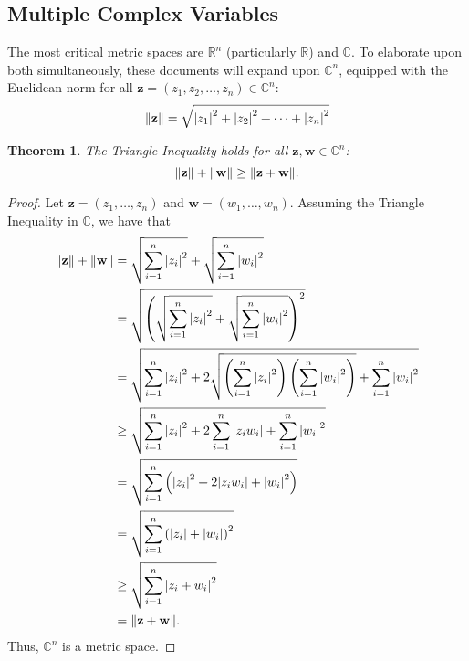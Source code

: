 \documentclass[11pt]{article}
\renewcommand{\vec}[1]{\mathbf{#1}}
\newtheorem{theorem}{Theorem}
\begin{document}

\subsection{Multiple Complex Variables}

The most critical metric spaces are $\mathbb{R}^{n}$ (particularly $\mathbb{R}$) and $\mathbb{C}$. To elaborate upon both simultaneously, these documents will expand upon $\mathbb{C}^{n}$, equipped with the Euclidean norm for all $\vec{z} = (z_{1}, z_{2}, \ldots, z_{n}) \in \mathbb{C}^{n}$:
\[
	\norm{\vec{z}} = \sqrt{\abs{z_{1}}^{2} + \abs{z_{2}}^{2} + \cdots + \abs{z_{n}}^{2}}
\]
\newpage
\begin{theorem}
	The Triangle Inequality holds for all $\vec{z}, \vec{w} \in \mathbb{C}^{n}$:
	\[
		\norm{\vec{z}} + \norm{\vec{w}} \ge \norm{\vec{z} + \vec{w}}.
	\]
\end{theorem}
\begin{adjustwidth}{1cm}{}
	\begin{proof}
		Let $\vec{z} = (z_{1}, \ldots, z_{n})$ and $\vec{w} = (w_{1}, \ldots, w_{n})$. Assuming the Triangle Inequality in $\mathbb{C}$, we have that
		\begin{align*}
			\norm{\vec{z}} + \norm{\vec{w}} &= \sqrt{\sum\limits_{i = 1}^{n} \abs{z_{i}}^{2}} + \sqrt{\sum\limits_{i = 1}^{n} \abs{w_{i}}^{2}} \\
			&= \sqrt{\left(\sqrt{\sum\limits_{i = 1}^{n} \abs{z_{i}}^{2}} + \sqrt{\sum\limits_{i = 1}^{n} \abs{w_{i}}^{2}}\right)^{2}} \\
			&= \sqrt{\sum\limits_{i = 1}^{n} \abs{z_{i}}^{2} + 2 \sqrt{\left( \sum\limits_{i = 1}^{n} \abs{z_{i}}^{2} \right)\left( \sum\limits_{i = 1}^{n} \abs{w_{i}}^{2} \right)} + \sum\limits_{i = 1}^{n} \abs{w_{i}}^{2}} \\
			&\ge \sqrt{\sum\limits_{i = 1}^{n} \abs{z_{i}}^{2} + 2 \sum\limits_{i = 1}^{n} \abs{z_{i}w_{i}} + \sum\limits_{i = 1}^{n} \abs{w_{i}}^{2}} \\
			&= \sqrt{\sum\limits_{i = 1}^{n} \left( \abs{z_{i}}^{2} + 2 \abs{z_{i}w_{i}} + \abs{w_{i}}^{2} \right)} \\
			&= \sqrt{\sum\limits_{i = 1}^{n} \left(\abs{z_{i}} + \abs{w_{i}}\right)^{2}} \\
			&\ge \sqrt{\sum\limits_{i = 1}^{n} \abs{z_{i} + w_{i}}^{2}} \\
			&= \norm{\vec{z} + \vec{w}}.
		\end{align*}
		Thus, $\mathbb{C}^{n}$ is a metric space.
	\end{proof}
\end{adjustwidth}
\end{document}
